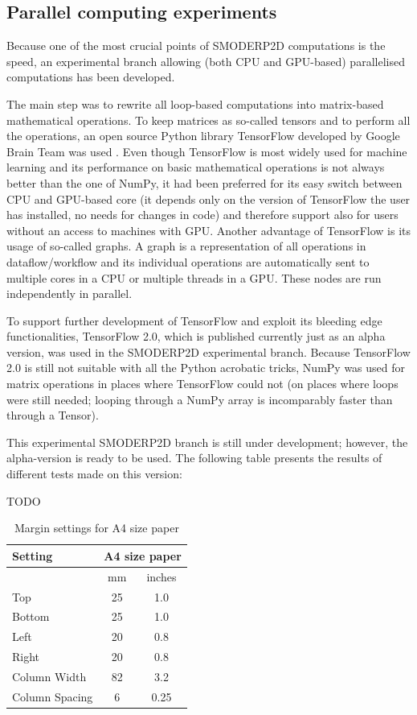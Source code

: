 \subsection{Parallel computing experiments}

Because one of the most crucial points of SMODERP2D computations is
the speed, an experimental branch allowing (both CPU and GPU-based)
parallelised computations has been developed.

The main step was to rewrite all loop-based computations into
matrix-based mathematical operations. To keep matrices as so-called
tensors and to perform all the operations, an open source Python
library TensorFlow developed by Google Brain Team was used \cite{xxx}.
Even though TensorFlow is most widely used for machine learning and
its performance on basic mathematical operations is not always better
than the one of NumPy, it had been preferred for its easy switch
between CPU and GPU-based core (it depends only on the version of
TensorFlow the user has installed, no needs for changes in code) and
therefore support also for users without an access to machines with
GPU. Another advantage of TensorFlow is its usage of so-called
graphs. A graph is a representation of all operations in
dataflow/workflow and its individual operations are automatically sent
to multiple cores in a CPU or multiple threads in a GPU. These nodes
are run independently in parallel.

To support further development of TensorFlow and exploit its bleeding
edge functionalities, TensorFlow 2.0, which is published currently
just as an alpha version, was used in the SMODERP2D experimental
branch. Because TensorFlow 2.0 is still not suitable with all the
Python acrobatic tricks, NumPy was used for matrix operations in
places where TensorFlow could not (on places where loops were still
needed; looping through a NumPy array is incomparably faster than
through a Tensor).

This experimental SMODERP2D branch is still under development;
however, the alpha-version is ready to be used. The following table
presents the results of different tests made on this version:

TODO

\begin{table}[h]
  \centering
  \begin{tabular}{|l|c|c|}\hline
    Setting&\multicolumn{2}{c|}{A4 size paper}\\\hline
    &mm&inches\\
    Top&25&1.0\\
    Bottom&25&1.0\\
    Left&20&0.8\\
    Right&20&0.8\\
    Column Width&82&3.2\\
    Column Spacing&6&0.25\\\hline
  \end{tabular}
  \caption{Margin settings for A4 size paper}
  \label{tab:Margin_settings}
\end{table}

